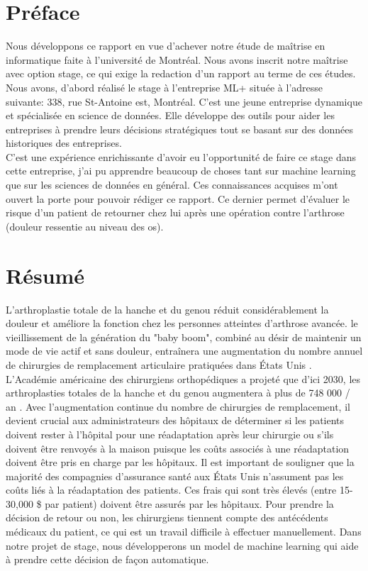 \documentclass[12pt, french]{report}
\begin{document}
\newpage

\chapter*{Préface}
Nous développons ce rapport en vue d'achever notre étude de maîtrise en informatique faite à l'université de Montréal. Nous avons inscrit notre maîtrise avec option stage, ce qui exige la redaction d'un rapport au terme de ces études. Nous avons, d'abord réalisé le stage à l'entreprise ML+ située à l'adresse suivante: 338, rue St-Antoine est, Montréal. C'est une jeune entreprise dynamique et spécialisée en science de données. Elle développe des outils pour aider les entreprises à prendre leurs décisions stratégiques tout se basant sur des données historiques des entreprises. \\

C'est une expérience enrichissante d'avoir eu l'opportunité de faire ce stage dans cette entreprise, j'ai pu apprendre beaucoup de choses tant sur machine learning que sur les sciences de données en général. Ces connaissances acquises m'ont ouvert  la porte pour pouvoir rédiger ce rapport. Ce dernier permet d'évaluer le risque d'un patient de retourner chez lui après une opération contre l'arthrose (douleur ressentie au niveau des os).  

\newpage

\listoffigures

\newpage

\listoftables

\newpage

\chapter*{Résumé}
L'arthroplastie totale de la hanche et du genou réduit considérablement la douleur
et améliore la fonction chez les personnes atteintes d'arthrose avancée. le
vieillissement de la génération du "baby boom", combiné au désir de
maintenir un mode de vie actif et sans douleur, entraînera une augmentation
du nombre annuel de chirurgies de remplacement articulaire pratiquées dans
États Unis \cite{key2}. L'Académie américaine des chirurgiens orthopédiques a
projeté que d'ici 2030, les arthroplasties totales de la hanche et du genou
augmentera à plus de 748 000 / an \cite{key3}. 
Avec l'augmentation continue du nombre de chirurgies de remplacement, il devient crucial aux administrateurs des hôpitaux de déterminer si les patients doivent rester à l'hôpital pour une réadaptation après leur 	chirurgie ou s'ils doivent être renvoyés à la maison puisque les coûts associés à une réadaptation doivent être pris en charge par les hôpitaux. Il est important de souligner que la majorité des compagnies d'assurance santé aux États Unis n'assument pas les coûts liés à la réadaptation des patients. Ces frais qui sont très élevés (entre 15-30,000 \$ par patient) doivent être assurés par les hôpitaux. Pour prendre la décision de retour ou non, les chirurgiens tiennent compte des antécédents médicaux du patient, ce qui est un travail difficile à effectuer manuellement. Dans notre projet de stage, nous développerons un model de machine learning qui aide à prendre cette décision de façon automatique.
   	
\end{document}
